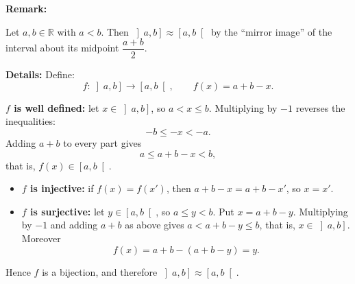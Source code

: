 \documentclass[11pt,a4paper]{article}
\newcommand{\R}{\mathbb{R}}
\newenvironment{remark}{
	\begin{remarkbox}
		\textbf{\color{remarkColor}Remark:} 
	}{
	\end{remarkbox}
}
\begin{document}
\begin{remark}
	Let $a,b\in\R$ with $a<b$. Then $\left]a,b\right]\approx\left[a,b\right[$ by the ``mirror image'' of the interval about its midpoint $\dfrac{a+b}{2}$.
	
	\vspace{0.5em}
	\noindent \textbf{Details:}
	Define:
	\[
	f:\left]a,b\right]\to\left[a,b\right[, \qquad f(x)=a+b-x .
	\]
	
	\noindent \textbf{$f$ is well defined:} let $x\in\left]a,b\right]$, so $a<x\leq b$. Multiplying by $-1$ reverses the inequalities:
	\[
	-b\leq -x<-a .
	\]
	Adding $a+b$ to every part gives
	\[
	a\leq a+b-x<b ,
	\]
	that is, $f(x)\in\left[a,b\right[$.
	
	\begin{itemize}
		\item \textbf{$f$ is injective:} if $f(x)=f(x')$, then $a+b-x=a+b-x'$, so $x=x'$.
		\item \textbf{$f$ is surjective:} let $y\in\left[a,b\right[$, so $a\leq y<b$. Put $x=a+b-y$. Multiplying by $-1$ and adding $a+b$ as above gives $a<a+b-y\leq b$, that is, $x\in\left]a,b\right]$. Moreover
		\[
		f(x)=a+b-(a+b-y)=y .
		\]
	\end{itemize}
	
	\noindent Hence $f$ is a bijection, and therefore $\left]a,b\right]\approx\left[a,b\right[$.
	
\end{remark}
\end{document}

